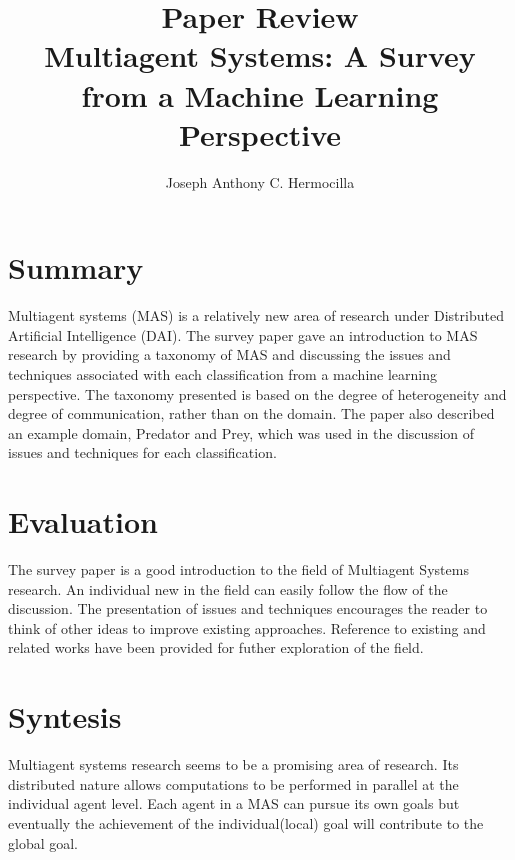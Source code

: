 \documentclass{article}
\title{Paper Review\\
	Multiagent Systems: A Survey from a Machine Learning Perspective\cite{pstone00}}
\author{Joseph Anthony C. Hermocilla}
\begin{document}
\maketitle
\section{Summary}
Multiagent systems (MAS) is a relatively new area of research under Distributed 
Artificial Intelligence (DAI). The survey paper gave an introduction to MAS
research by providing a taxonomy of MAS and discussing the issues and techniques
associated with each classification from a machine learning perspective. 
The taxonomy presented is based on the 
degree of heterogeneity and degree of communication, rather than on the domain. 
The paper also described an example domain, Predator and Prey, which was used in the  
discussion of issues and techniques for each classification. 


\section{Evaluation}
The survey paper is a good introduction to the field of Multiagent Systems research.
An individual new in the field can easily follow the flow of the discussion. The 
presentation of issues and techniques encourages the reader to think of other ideas
to improve existing approaches. Reference to existing and related works have been
provided for futher exploration of the field.

\section{Syntesis}
Multiagent systems research seems to be a promising area of research. Its distributed
nature allows computations to be performed in parallel at the individual agent level.  
Each agent in a MAS can pursue its own goals but eventually the achievement of the
individual(local) goal will contribute to the global goal.



\nocite{pfong04}
\end{document}
